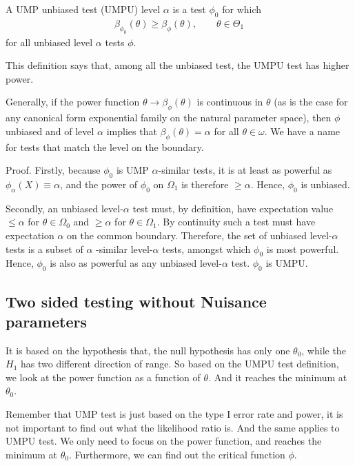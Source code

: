 \begin{itemize}
A UMP unbiased test (UMPU) level $\alpha$ is a test $\phi_0$ for which
\begin{align*}
	\beta_{\phi_0}(\theta) \geq \beta_{\phi}(\theta), \qquad \theta \in \Theta_1
\end{align*}
for all unbiased level $\alpha$ tests $\phi$.

This definition says that, among all the unbiased test, the UMPU test has higher power.

Generally, if the power function $\theta \rightarrow \beta_{\phi}(\theta)$ is continuous in $\theta$ (as is the case for any canonical form exponential family on the natural parameter space), then $\phi$ unbiased and of level $\alpha$ implies that $\beta_{\phi}(\theta) = \alpha$ for all $ \theta \in \omega $. We have a name for tests that match the level on the boundary.

Proof. Firstly, because $\phi_0$ is UMP $\alpha$-similar tests, it is at least as powerful as $\phi_{\alpha}(X) \equiv \alpha$, and the power of $\phi_0$ on $\Omega_1$ is therefore $\geq \alpha$. Hence, $\phi_0$ is unbiased.

Secondly, an unbiased level-$\alpha$ test must, by definition, have expectation value $\leq \alpha$ for $\theta \in \Omega_0$ and $\geq \alpha$ for $\theta \in \Omega_1$. By continuity such a test must have expectation $\alpha$  on the common boundary. Therefore, the set of unbiased level-$\alpha$  tests is a subset of $\alpha$ -similar level-$\alpha$  tests, amongst which $\phi_0$ is most powerful. Hence, $\phi_0$ is also as powerful as any unbiased level-$\alpha$ test. $\phi_0$ is UMPU.

\end{itemize}



\subsection{Two sided testing without Nuisance parameters}

It is based on the hypothesis that, the null hypothesis has only one $\theta_0$, while the $H_1$ has two different direction of range. So based on the UMPU test definition, we look at the power function as a function of $\theta$. And it reaches the minimum at $\theta_0$.

Remember that UMP test is just based on the type I error rate and power, it is not important to find out what the likelihood ratio is. And the same applies to UMPU test. We only need to focus on the power function, and reaches the minimum at $\theta_0$. Furthermore, we can find out the critical function $\phi$. 

